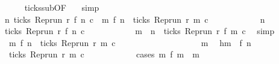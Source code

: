 \begin{isabellebody}
\ \ \ \ \isamarkupfalse%
\ ticks{\isacharunderscore}sub{\isacharbrackleft}OF\ {\isacharasterisk}{\isacharbrackright}\ \isamarkupfalse%
\ simp\isanewline
\ \ \isamarkupfalse%
\ {\isacartoucheopen}{\isasymforall}n{\isachardot}\ ticks\ {\isacharparenleft}Rep{\isacharunderscore}run\ r\ {\isacharparenleft}f\ n{\isacharparenright}\ c\ {\isasymlongrightarrow}\ {\isacharparenleft}{\isasymforall}m{\isasymge}\ {\isacharparenleft}f\ n{\isacharparenright}{\isachardot}\ {\isasymnot}\ ticks\ {\isacharparenleft}Rep{\isacharunderscore}run\ r\ m\ c\isanewline
\ \ \isamarkupfalse%
\ {\isacharminus}\isanewline
\ \ \ \ \isacommand{{\isacharbraceleft}}\isamarkupfalse%
\ \isamarkupfalse%
\ n\ \isamarkupfalse%
\ {\isacartoucheopen}ticks\ {\isacharparenleft}Rep{\isacharunderscore}run\ r\ {\isacharparenleft}f\ n{\isacharparenright}\ c\isanewline
\ \ \ \ \ \ \isamarkupfalse%
\ {}\ \isamarkupfalse%
\ {}{\isacharcolon}{\isacartoucheopen}{\isasymforall}\ m\ {\isasymge}\ n{\isachardot}\ {\isasymnot}\ ticks\ {\isacharparenleft}Rep{\isacharunderscore}run\ r\ {\isacharparenleft}f\ m{\isacharparenright}\ c\ \isamarkupfalse%
\ simp\isanewline
\ \ \ \ \ \ \isamarkupfalse%
\ {\isacartoucheopen}{\isasymforall}\ m{\isasymge}\ {\isacharparenleft}f\ n{\isacharparenright}{\isachardot}\ {\isasymnot}\ ticks\ {\isacharparenleft}Rep{\isacharunderscore}run\ r\ m\ c\isanewline
\ \ \ \ \ \ \isamarkupfalse%
\ {\isacharminus}\isanewline
\ \ \ \ \ \ \ \ \isacommand{{\isacharbraceleft}}\isamarkupfalse%
\ \isamarkupfalse%
\ m\ \isamarkupfalse%
\ h{\isacharcolon}{\isacartoucheopen}m\ {\isasymge}\ f\ n{\isacartoucheclose}\isanewline
\ \ \ \ \ \ \ \ \ \ \isamarkupfalse%
\ {\isacartoucheopen}{\isasymnot}\ ticks\ {\isacharparenleft}Rep{\isacharunderscore}run\ r\ m\ c\isanewline
\ \ \ \ \ \ \ \ \ \ \isamarkupfalse%
\ {\isacharparenleft}cases\ {\isacartoucheopen}{\isasymexists}m\ f\ m\ {\isacharequal}\ m{\isacartoucheclose}{\isacharparenright}\isanewline

\end{isabellebody}
